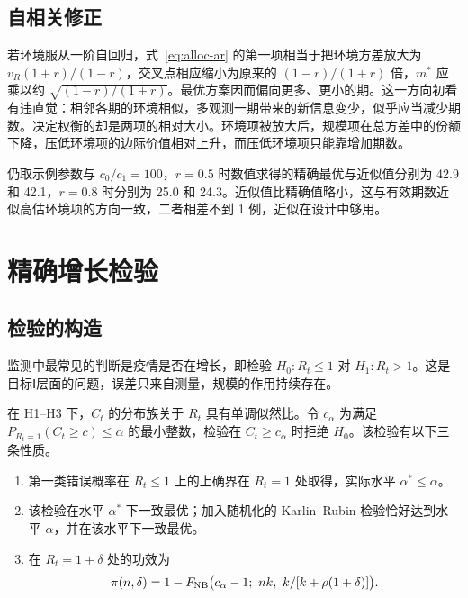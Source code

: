 \subsection{自相关修正}

若环境服从一阶自回归，式~\eqref{eq:alloc-ar} 的第一项相当于把环境方差放大为 $v_R(1+r)/(1-r)$，交叉点相应缩小为原来的 $(1-r)/(1+r)$ 倍，$m^*$ 应乘以约 $\sqrt{(1-r)/(1+r)}$。最优方案因而偏向更多、更小的期。这一方向初看有违直觉：相邻各期的环境相似，多观测一期带来的新信息变少，似乎应当减少期数。决定权衡的却是两项的相对大小。环境项被放大后，规模项在总方差中的份额下降，压低环境项的边际价值相对上升，而压低环境项只能靠增加期数。

仍取示例参数与 $c_0/c_1=100$，$r=0.5$ 时数值求得的精确最优与近似值分别为 42.9 和 42.1，$r=0.8$ 时分别为 25.0 和 24.3。近似值比精确值略小，这与有效期数近似高估环境项的方向一致，二者相差不到 1 例，近似在设计中够用。

\section{精确增长检验}
\label{sec:design-test}

\subsection{检验的构造}

监测中最常见的判断是疫情是否在增长，即检验 $H_0\colon R_t\leq1$ 对 $H_1\colon R_t>1$。这是目标Ⅰ层面的问题，误差只来自测量，规模的作用持续存在。

\begin{proposition}[精确增长检验]
\label{prop:test}
在 H1--H3 下，$C_t$ 的分布族关于 $R_t$ 具有单调似然比。令 $c_\alpha$ 为满足 $P_{R_t=1}(C_t\geq c)\leq\alpha$ 的最小整数，检验在 $C_t\geq c_\alpha$ 时拒绝 $H_0$。该检验有以下三条性质。
\begin{enumerate}[label=(\roman*)]
  \item 第一类错误概率在 $R_t\leq1$ 上的上确界在 $R_t=1$ 处取得，实际水平 $\alpha^*\leq\alpha$。
  \item 该检验在水平 $\alpha^*$ 下一致最优；加入随机化的 Karlin--Rubin 检验恰好达到水平 $\alpha$，并在该水平下一致最优。
  \item 在 $R_t=1+\delta$ 处的功效为
  \begin{equation}
    \pi(n,\delta)=1-F_{\NB}\bigl(c_\alpha-1;\ nk,\ k/[k+\rho(1+\delta)]\bigr).
    \label{eq:power}
  \end{equation}
\end{enumerate}
\end{proposition}

